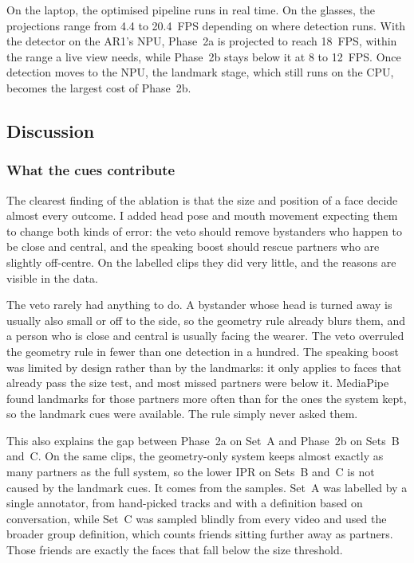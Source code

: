 On the laptop, the optimised pipeline runs in real time. On the glasses, the projections
range from 4.4 to 20.4~FPS depending on where detection runs. With the detector on the
AR1's NPU, Phase~2a is projected to reach 18~FPS, within the range a live view needs, while
Phase~2b stays below it at 8 to 12~FPS. Once detection moves to the NPU, the landmark stage,
which still runs on the CPU, becomes the largest cost of Phase~2b.

\subsection{Discussion}
\label{sec:discussion}

\subsubsection{What the cues contribute}
\label{sec:disc_cues}

The clearest finding of the ablation is that the size and position of a face decide
almost every outcome. I added head pose and mouth movement expecting them to change both
kinds of error: the veto should remove bystanders who happen to be close and central, and
the speaking boost should rescue partners who are slightly off-centre. On the labelled
clips they did very little, and the reasons are visible in the data.

The veto rarely had anything to do. A bystander whose head is turned away is usually also
small or off to the side, so the geometry rule already blurs them, and a person who is
close and central is usually facing the wearer. The veto overruled the geometry rule in
fewer than one detection in a hundred. The speaking boost was limited by design rather than
by the landmarks: it only applies to faces that already pass the size test, and most missed
partners were below it. MediaPipe found landmarks for those partners more often than for
the ones the system kept, so the landmark cues were available. The rule simply never asked
them.

This also explains the gap between Phase~2a on Set~A and Phase~2b on Sets~B and~C. On the
same clips, the geometry-only system keeps almost exactly as many partners as the full
system, so the lower IPR on Sets~B and~C is not caused by the landmark cues. It comes from
the samples. Set~A was labelled by a single annotator, from hand-picked tracks and with a
definition based on conversation, while Set~C was sampled blindly from every video and used the broader group
definition, which counts friends sitting further away as partners. Those friends are
exactly the faces that fall below the size threshold.

